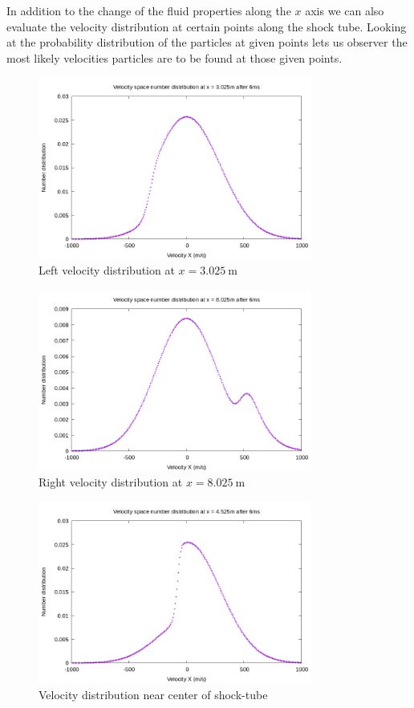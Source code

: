 \documentclass[paper=a4, fontsize=12pt]{scrartcl}
\begin{document}
\noindent
In addition to the change of the fluid properties along the $x$ axis we can also
evaluate the velocity distribution at certain points along the shock tube.
Looking at the probability distribution of the particles at given points lets us
observer the most likely velocities particles are to be found at those given points.

\begin{figure}[H]
        \centering
        \includegraphics[width=0.8\textwidth]{left_f}
        \caption{Left velocity distribution at $x = \SI{3.025}{\meter}$ }
        \label{fig:left_f}
\end{figure}
\begin{figure}[H]
        \centering
        \includegraphics[width=0.8\textwidth]{right_f}
        \caption{Right velocity distribution at $x = \SI{8.025}{\meter}$ }
        \label{fig:right_f}
\end{figure}
\begin{figure}[H]
        \centering
        \includegraphics[width=0.8\textwidth]{center_shock}
        \caption{Velocity distribution near center of shock-tube}
        \label{fig:center_shock}
\end{figure}
\end{document}
